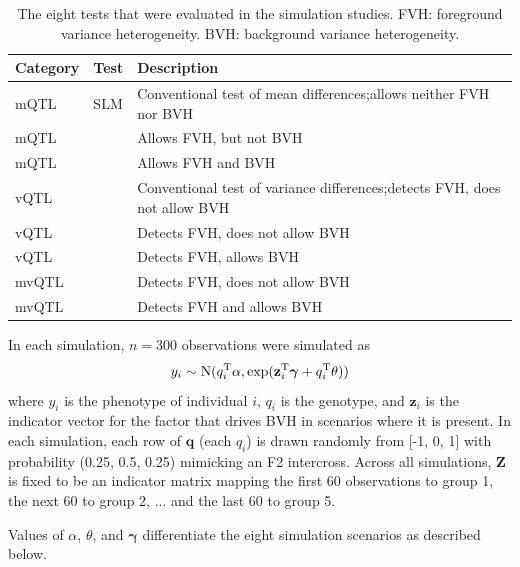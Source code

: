 \begin{table}
    \centering
    \begin{tabular}{l|l|p{7cm}}
    \hline
     \textbf{Category} & \textbf{Test} & \textbf{Description} \\
    \hline
    mQTL        & SLM       & Conventional test of mean differences;\newline allows neither FVH nor BVH \\
    mQTL        & \Caom{}   & Allows FVH, but not BVH \\
    mQTL        & \DGLMm{}  & Allows FVH and BVH \\
    \hline
    vQTL        & \Lev{}    & Conventional test of variance differences;\newline detects FVH, does not allow BVH \\
    vQTL        & \Caov{}   & Detects FVH, does not allow BVH \\
    vQTL        & \DGLMv{}  & Detects FVH, allows BVH \\
    \hline
    mvQTL       & \Caomv{}  & Detects FVH, does not allow BVH \\
    mvQTL       & \DGLMmv{} & Detects FVH and allows BVH \\
    \hline
    \end{tabular}
    \caption[
      The eight tests that were evaluated in the simulation studies.
    ]
    {
      The eight tests that were evaluated in the simulation studies. FVH: foreground variance heterogeneity. BVH: background variance heterogeneity.
    }
    \label{tab:tests}
\end{table}

In each simulation, $n = 300$ observations were simulated as
\[
    y_i \sim \mathrm{N}(q_i^\mathrm{T} \alpha, \exp(\mathbf{z}_i^\mathrm{T}\bm{\gamma} + q_i^\mathrm{T} \theta))
\]
where $y_i$ is the phenotype of individual $i$,
    ${q_i}$ is the genotype,
    and $\mathbf{z}_i$ is the indicator vector for the factor that drives BVH in scenarios where it is present.
    In each simulation, each row of $\mathbf{q}$ (each ${q}_i$) is drawn randomly from [-1, 0, 1] with probability (0.25, 0.5, 0.25) mimicking an F2 intercross.
    Across all simulations, $\bm{Z}$ is fixed to be an indicator matrix mapping the first 60 observations to group 1, the next 60 to group 2, ... and the last 60 to group 5.

Values of $\alpha$, $\theta$, and $\bm{\gamma}$ differentiate the eight simulation scenarios as described below.

